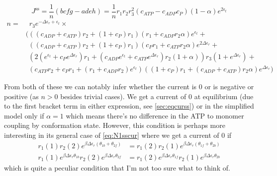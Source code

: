 \documentclass[11pt]{article}
\begin{document}
\begin{tcolorbox}
	\begin{equation}
		J^\text{ss} = \frac{1}{n}(bcfg-adeh) = \frac{1}{n}r_1r_2r_3^{2} \left( c_{ATP} - c_{ADP} c_P \right) (1 - \alpha) e^{2 \epsilon_t} \label{eq:N1sscurs}
	\end{equation}
	\begin{align}
		n = & \enspace r_3 e^{ - \Delta\epsilon_{r} + \epsilon_{t}} \times \nonumber                                                                                                                                    \\
		    & \big( ( ( c_{ADP} + c_{ATP} ) r_2 + ( 1 + c_P ) r_1 ) ( r_1 + c_{ADP} r_2 \alpha ) e^{\epsilon_{t}} + \nonumber                                                                                           \\
		    & \phantom{(} ( ( c_{ADP} + c_{ATP} ) r_2 + ( 1 + c_P ) r_1 ) ( c_P r_1 + c_{ATP} r_2 \alpha ) e^{2 \Delta\epsilon_{r}} +\nonumber                                                                          \\
		    & \phantom{(} ( 2 ( e^{\epsilon_{t}} + c_P e^{\Delta\epsilon_{r}} ) r_1 + ( c_{ADP} e^{\epsilon_{t}} + c_{ATP} e^{\Delta\epsilon_{r}} ) r_2 ( 1 + \alpha ) ) r_3 ( 1 + e^{\Delta\epsilon_{r}} ) + \nonumber \\
		    & \phantom{(} ( c_{ATP} r_2 + c_P r_1 + ( r_1 + c_{ADP} r_2 ) e^{\epsilon_{t}} ) ( ( 1 + c_P ) r_1 + ( c_{ADP} + c_{ATP} ) r_2 \alpha ) e^{\Delta\epsilon_{r}} \big)
	\end{align}
\end{tcolorbox}

From both of these we can notably infer whether the current is 0 or is negative or positive (as $n>0$ besides trivial cases).
We get a current of 0 at equilibrium (due to the first bracket term in either expression, see \cref{sec:eqcurss}) or in the simplified model only if $\alpha = 1$ which means there's no difference in the ATP to monomer coupling by conformation state.
However, this condition is perhaps more interesting in its general case of \cref{eq:N1sscur} where we get a current of 0 if
\begin{align}
	r_{1}(1) r_{2}(2) e^{\beta\Delta\epsilon_{r} \left( \theta_{1b} + \theta_{2f} \right)}          & =
	r_{1}(2) r_{2}(1) e^{\beta\Delta\epsilon_{r} \left( \theta_{1f} + \theta_{2b} \right)}              \\
	r_{1}(1) e^{\beta\Delta\epsilon_{r}\theta_{1b}} r_{2}(2) e^{\beta\Delta\epsilon_{r}\theta_{2f}} & =
	r_{1}(2) e^{\beta\Delta\epsilon_{r}\theta_{1f}} r_{2}(1) e^{\beta\Delta\epsilon_{r}\theta_{2b}}
\end{align}
which is quite a peculiar condition that I'm not too sure what to think of.
\end{document}
